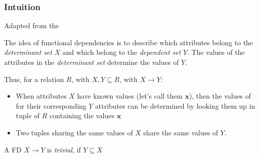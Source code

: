 \subsubsection{Intuition}
Adapted from the 

The idea of functional dependencies is to describe which attributes belong to the \textit{determinant set} $X$ and which belong to the \textit{dependent set} $Y$.
The values of the attributes in the \textit{determinant set} determine the values of $Y$.

Thus, for a relation $R$, with $X, Y \subseteq R$, with $X \rightarrow Y$:
\begin{itemize}
    \item When attributes $X$ have known values (let's call them $\bm{x}$),
          then the values of for their corresponding $Y$ attributes can be determined by looking them up in  tuple of $R$ containing the values $\bm{x}$
    \item Two tuples sharing the same values of $X$ share the same values of $Y$.
\end{itemize}
A FD $X \rightarrow Y$ is \textit{trivial}, if $Y \subseteq X$
